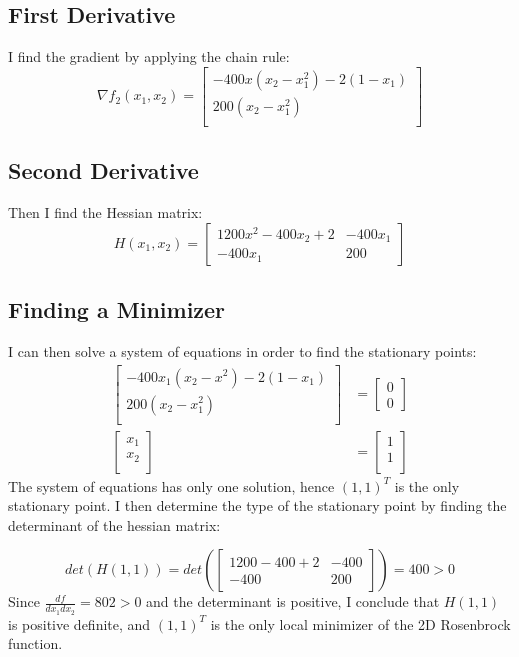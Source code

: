 \documentclass[a4paper]{article}
\begin{document}
\subsection{First Derivative}
I find the gradient by applying the chain rule:
\[
\nabla f_2(x_1, x_2) = 
\begin{bmatrix}
    -400x(x_2 - x_1^2) - 2(1-x_1) \\
    200(x_2 - x_1^2)            \\
\end{bmatrix}
\]
\subsection{Second Derivative}
Then I find the Hessian matrix:
\[
H(x_1,x_2) = 
\begin{bmatrix}
    1200x^2 - 400x_2 + 2 & -400x_1     \\
    -400x_1 & 200
\end{bmatrix}
\]

\subsection{Finding a Minimizer}
I can then solve a system of equations in order to find the stationary points:
\begin{align*}
\begin{bmatrix}
    -400x_1(x_2 - x^2) - 2(1-x_1) \\
    200(x_2 - x_1^2)            \\
\end{bmatrix}
&=
\begin{bmatrix}
    0 \\
    0    
\end{bmatrix}\\
\begin{bmatrix}
    x_1 \\
    x_2 \\
\end{bmatrix}
&=
\begin{bmatrix}
    1 \\
    1 \\
\end{bmatrix}
\end{align*}
The system of equations has only one solution, hence $(1,1)^T$ is the only
stationary point. I then determine the type of the stationary point by 
finding the determinant of the hessian matrix:

\[
det(H(1,1)) = 
det\left(\begin{bmatrix}
    1200 - 400 + 2 & -400     \\
    -400 & 200
\end{bmatrix}\right)
= 400 > 0
\]
Since $\frac{df}{dx_1dx_2} = 802 > 0$ and the determinant is positive, I conclude that
$H(1,1)$ is positive definite, and $(1,1)^T$ is the only local minimizer of the
2D Rosenbrock function.
\end{document}
